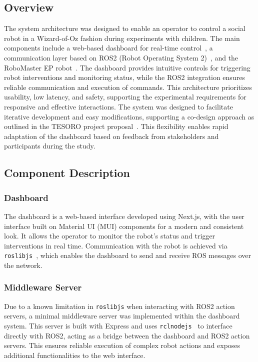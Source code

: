 \documentclass[a4paper]{usiinfbachelorproject}
\begin{document}
\subsection*{\textbf{Overview}}
The system architecture was designed to enable an operator to control a social robot in a Wizard-of-Oz fashion during experiments with children.
The main components include a web-based dashboard for real-time control~\cite{frovaaa2025hogwarts}, a communication layer based on ROS2 (Robot Operating System 2)~\cite{ros2, frovaaa2025robomaster, frovaaa2025robomasterhri}, and the RoboMaster EP robot~\cite{djirobomasterep}.
The dashboard provides intuitive controls for triggering robot interventions and monitoring status, while the ROS2 integration ensures reliable communication and execution of commands.
This architecture prioritizes usability, low latency, and safety, supporting the experimental requirements for responsive and effective interactions.
The system was designed to facilitate iterative development and easy modifications, supporting a co-design approach as outlined in the TESORO project proposal~\cite{landoni2025tesoro}.
This flexibility enables rapid adaptation of the dashboard based on feedback from stakeholders and participants during the study.

\subsection{\textbf{Component Description}}
\subsubsection*{\textbf{Dashboard}}
The dashboard is a web-based interface developed using Next.js, with the user interface built on Material UI (MUI) components for a modern and consistent look.
It allows the operator to monitor the robot's status and trigger interventions in real time. Communication with the robot is achieved via \texttt{roslibjs}~\cite{roslibjs}, which enables the dashboard to send and receive ROS messages over the network.

\subsubsection*{\textbf{Middleware Server}}
Due to a known limitation in \texttt{roslibjs} when interacting with ROS2 action servers, a minimal middleware server was implemented within the dashboard system.
This server is built with Express and uses \texttt{rclnodejs}~\cite{rclnodejs} to interface directly with ROS2, acting as a bridge between the dashboard and ROS2 action servers.
This ensures reliable execution of complex robot actions and exposes additional functionalities to the web interface.
\end{document}
